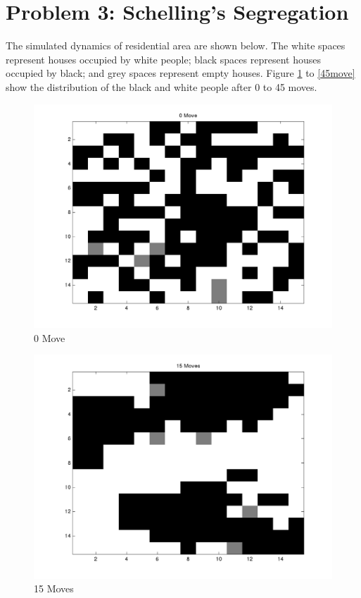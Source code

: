 \section*{Problem 3: Schelling's Segregation}
The simulated dynamics of residential area are shown below. The white spaces represent houses occupied by white people; black spaces represent houses occupied by black; and grey spaces represent empty houses. Figure \ref{0move} to \ref{45move} show the distribution of the black and white people after 0 to 45 moves.


\begin{figure}[htbp]
	\begin{center}
		\includegraphics[width=12cm]{Plot/Q3/PS1_Q3_0Move.png}
		\caption{0 Move}
		\label{0move}
	\end{center}
\end{figure}	

\begin{figure}[htbp]
	\begin{center}
		\includegraphics[width=12cm]{Plot/Q3/PS1_Q3_15Move.png}
		\caption{15 Moves}
	\end{center}
\end{figure}

